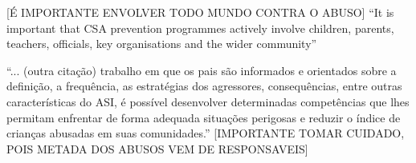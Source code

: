 [É IMPORTANTE ENVOLVER TODO MUNDO CONTRA O ABUSO]
``It is important that CSA prevention programmes actively involve children, parents, teachers, officials, key organisations and the wider community''  \cite{dip2016advancing}


``... (outra citação) trabalho  em  que  os  pais  são informados  e  orientados  sobre  a  definição,  a  frequência,  as  estratégias  dos  agressores, consequências, entre outras características do ASI, é possível desenvolver determinadas competências  que  lhes  permitam  enfrentar  de  forma  adequada  situações  perigosas  e reduzir  o  índice  de  crianças  abusadas  em  suas  comunidades.'' [IMPORTANTE TOMAR CUIDADO, POIS METADA DOS ABUSOS VEM DE RESPONSAVEIS] \cite{pinto2017avaliaccao}